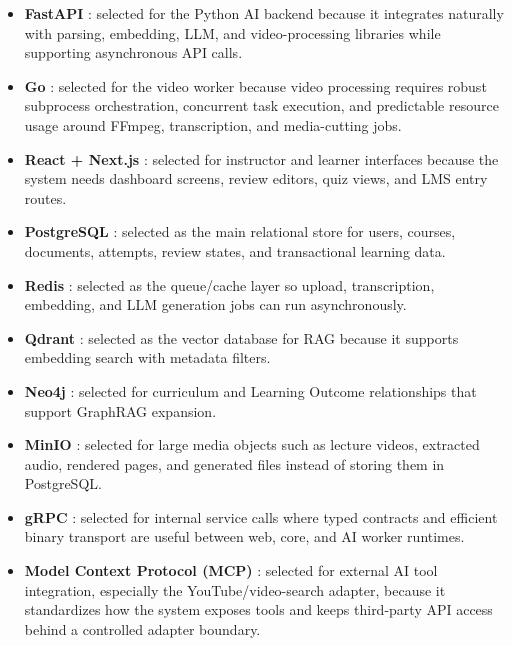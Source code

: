 \begin{itemize}
    \item \textbf{FastAPI} \cite{ramirez2018fastapi}: selected for the Python
          AI backend because it integrates naturally with parsing, embedding,
          LLM, and video-processing libraries while supporting asynchronous
          API calls.
    \item \textbf{Go} \cite{golang2026}: selected for the video worker because
          video processing requires robust subprocess orchestration, concurrent
          task execution, and predictable resource usage around FFmpeg,
          transcription, and media-cutting jobs.
    \item \textbf{React + Next.js} \cite{vercel2024nextjs}: selected for
          instructor and learner interfaces because the system needs
          dashboard screens, review editors, quiz views, and LMS entry routes.
    \item \textbf{PostgreSQL} \cite{postgresql2024}: selected as the main
          relational store for users, courses, documents, attempts, review
          states, and transactional learning data.
    \item \textbf{Redis} \cite{carlson2013redis}: selected as the queue/cache
          layer so upload, transcription, embedding, and LLM generation jobs
          can run asynchronously.
    \item \textbf{Qdrant} \cite{qdrant2024}: selected as the vector database
          for RAG because it supports embedding search with metadata filters.
    \item \textbf{Neo4j} \cite{neo4j2024}: selected for curriculum and
          Learning Outcome relationships that support GraphRAG expansion.
    \item \textbf{MinIO} \cite{minio2024}: selected for large media objects
          such as lecture videos, extracted audio, rendered pages, and
          generated files instead of storing them in PostgreSQL.
    \item \textbf{gRPC} \cite{grpc2024}: selected for internal service calls
          where typed contracts and efficient binary transport are useful
          between web, core, and AI worker runtimes.
    \item \textbf{Model Context Protocol (MCP)}
          \cite{modelcontextprotocol2025}: selected for external AI tool
          integration, especially the YouTube/video-search adapter, because it
          standardizes how the system exposes tools and keeps third-party API
          access behind a controlled adapter boundary.

\end{itemize}

